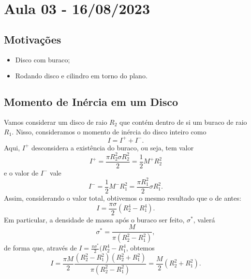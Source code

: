 \documentclass{article}
\begin{document}
\newpage

\section{Aula 03 - 16/08/2023}
\subsection{Motivações}
\begin{itemize}
  \item Disco com buraco;
  \item Rodando disco e cilindro em torno do plano.
\end{itemize}
\subsection{Momento de Inércia em um Disco}
  Vamos considerar um disco de raio \(R_{2}\) que contém dentro de si um buraco de
raio \(R_{1}\). Nisso, consideramos o momento de inércia do disco inteiro como 
  \[
    I = I^{+} + I^{-}.
  \]
  Aqui, \(I^{+}\) desconsidera a existência do buraco, ou seja, tem valor 
    \[
      I^{+} = \frac{\pi R_{2}^{2}\sigma R_{2}^{2}}{2} = \frac{1}{2}M^{+}R_{2}^{2}
    \]
  e o valor de \(I^{-}\) vale 
    \[
      I^{-} = \frac{1}{2}M^{-}R_{1}^{2} = \frac{\pi R_{1}^{2}}{2}\sigma R_{1}^{2}.
    \]
    Assim, considerando o valor total, obtivemos o mesmo resultado que o de antes: 
      \[
        I = \frac{\pi \sigma }{2}(R_{2}^{4} - R_{1}^{4}).
      \]
    Em particular, a densidade de massa após o buraco ser feito, \(\sigma^{*} \), valerá
      \[
        \sigma ^{*} = \frac{M}{\pi(R_{2}^{2} - R_{1}^{2})},
      \]
    de forma que, através de \(I = \frac{\pi \sigma^{*}}{2}(R_{2}^{4} - R_{1}^{4}\), obtemos 
      \[
        I = \frac{\pi M}{2} \frac{(R_{2}^{2}-R_{1}^{2})(R_{2}^{2}+R_{1}^{2})}{\pi (R_{2}^{2}-R_{1}^{2})} = \frac{M}{2}(R_{2}^{2}+R_{1}^{2}).
      \]
\end{document}
